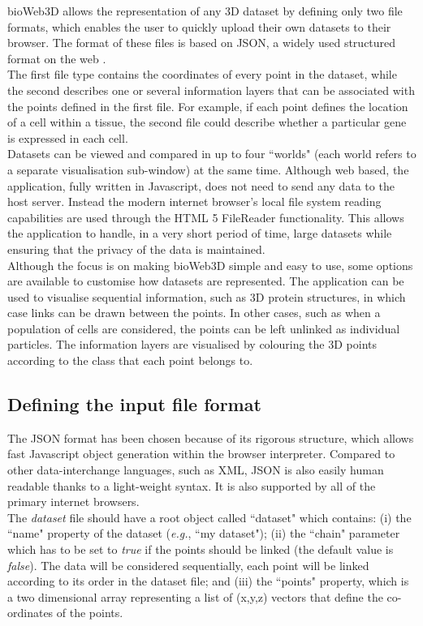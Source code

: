 \documentclass[10pt]{bmc_article}
\newenvironment{bmcformat}{\baselineskip20pt\sloppy\setboolean{publ}{false}}{\baselineskip20pt\sloppy}
\begin{document}
\begin{bmcformat}
bioWeb3D allows the representation of any 3D dataset by defining only two file formats, which enables the user to quickly upload their own datasets to their browser. The format of these files is based on JSON, a widely used structured format on the web \cite{Wilde07}.\\
The first file type contains the coordinates of every point in the dataset, while the second describes one or several information layers that can be associated with the points defined in the first file. For example, if each point defines the location of a cell within a tissue, the second file could describe whether a particular gene is expressed in each cell. \\
Datasets can be viewed and compared in up to four ``worlds" (each world refers to a separate visualisation sub-window) at the same time. Although web based, the application, fully written in Javascript, does not need to send any data to the host server. Instead the modern internet browser's local file system reading capabilities are used through the HTML 5 FileReader functionality. This allows the application to handle, in a very short period of time, large datasets while ensuring that the privacy of the data is maintained.\\
Although the focus is on making bioWeb3D simple and easy to use, some options are available to customise how datasets are represented. The application can be used to visualise sequential information, such as 3D protein structures, in which case links can be drawn between the points. In other cases, such as when a population of cells are considered, the points can be left unlinked as individual particles. The information layers are visualised by colouring the 3D points according to the class that each point belongs to.
\subsection{Defining the input file format}
The JSON format has been chosen because of its rigorous structure, which allows fast Javascript object generation within the browser interpreter. Compared to other data-interchange languages, such as XML, JSON is also easily human readable thanks to a light-weight syntax. It is also supported by all of the primary internet browsers.\\
The {\it{dataset}} file should have a root object called ``dataset" which contains: (i) the ``name" property of the dataset (\textit{e.g.}, ``my dataset"); (ii) the ``chain" parameter which has to be set to \textit{true} if the points should be linked (the default value is \textit{false}). The data will be considered sequentially, each point will be linked according to its order in the dataset file; and (iii) the ``points" property, which is a two dimensional array representing a list of (x,y,z) vectors that define the co-ordinates of the points.


\end{bmcformat}
\end{document}
